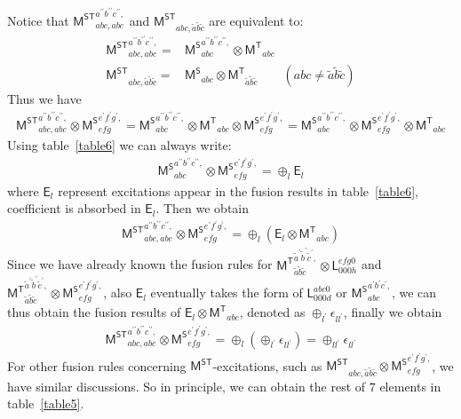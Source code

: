 \documentclass[11pt,nofootinbib,preprint]{revtex4-1}
\begin{document}
Notice that $\mathsf{M^{ST}}_{abc,abc}^{a^{\prime\prime}b^{\prime\prime}c^{\prime\prime},}$ and $\mathsf{M^{ST}}_{abc,\tilde{a}\tilde{b}\tilde{c}}$ are equivalent to:
\begin{align}
	\mathsf{M^{ST}}_{abc,abc}^{a^{\prime\prime}b^{\prime\prime}c^{\prime\prime},}=&\mathsf{M^S}_{abc}^{a^{\prime\prime}b^{\prime\prime}c^{\prime\prime},}\otimes \mathsf{M^T}_{abc}
	\\
	\mathsf{M^{ST}}_{abc,\tilde{a}\tilde{b}\tilde{c}}=&\mathsf{M^S}_{abc}\otimes \mathsf{M^T}_{\tilde{a}\tilde{b}\tilde{c}} \qquad \left(abc\ne\tilde{a}\tilde{b}\tilde{c}\right)
\end{align}
Thus we have 
\begin{align}
	\mathsf{M^{ST}}_{abc,abc}^{a^{\prime\prime}b^{\prime\prime}c^{\prime\prime},}\otimes \mathsf{M^S}_{efg}^{e^{\prime}f^{\prime}g^{\prime},}=\mathsf{M^S}_{abc}^{a^{\prime\prime}b^{\prime\prime}c^{\prime\prime},}\otimes \mathsf{M^T}_{abc}\otimes \mathsf{M^S}_{efg}^{e^{\prime}f^{\prime}g^{\prime},}=\mathsf{M^S}_{abc}^{a^{\prime\prime}b^{\prime\prime}c^{\prime\prime},}\otimes \mathsf{M^S}_{efg}^{e^{\prime}f^{\prime}g^{\prime},}\otimes \mathsf{M^T}_{abc}
\end{align}
Using table~\ref{table6} we can always write:
\begin{align}
	\mathsf{M^S}_{abc}^{a^{\prime\prime}b^{\prime\prime}c^{\prime\prime},}\otimes \mathsf{M^S}_{efg}^{e^{\prime}f^{\prime}g^{\prime},}=\oplus_{l}\mathsf{E}_{l}
\end{align}
where $\mathsf{E}_{l}$ represent excitations appear in the fusion results in table~\ref{table6}, coefficient is absorbed in $\mathsf{E}_{l}$. Then we obtain 
\begin{align}
	\mathsf{M^{ST}}_{abc,abc}^{a^{\prime\prime}b^{\prime\prime}c^{\prime\prime},}\otimes \mathsf{M^S}_{efg}^{e^{\prime}f^{\prime}g^{\prime},}=\oplus_{l}\left(\mathsf{E}_{l}\otimes \mathsf{M^T}_{abc}\right)
\end{align}
Since we have already known the fusion rules for $\mathsf{M^T}_{\tilde{a}\tilde{b}\tilde{c}}^{\tilde{a}^{\prime}\tilde{b}^{\prime}\tilde{c}^{\prime},}\otimes \mathsf{L}_{000h}^{efg0}$ and $\mathsf{M^T}_{\tilde{a}\tilde{b}\tilde{c}}^{\tilde{a}^{\prime}\tilde{b}^{\prime}\tilde{c}^{\prime},}\otimes \mathsf{M^S}_{efg}^{e^{\prime}f^{\prime}g^{\prime},}$, also $\mathsf{E}_{l}$ eventually takes the form of $\mathsf{L}_{000d}^{abc0}$ or $\mathsf{M^S}_{abc}^{a^{\prime}b^{\prime}c^{\prime},}$, we can thus obtain the fusion results of $\mathsf{E}_{l}\otimes \mathsf{M^T}_{abc}$, denoted as $\oplus_{l^{\prime}}\mathsf{\epsilon}_{ll^{\prime}}$, finally we obtain 
\begin{align}
	\mathsf{M^{ST}}_{abc,abc}^{a^{\prime\prime}b^{\prime\prime}c^{\prime\prime},}\otimes \mathsf{M^S}_{efg}^{e^{\prime}f^{\prime}g^{\prime},}=\oplus_{l}\left(\oplus_{l^{\prime}}\mathsf{\epsilon}_{ll^{\prime}}\right)=\oplus_{ll^{\prime}}\mathsf{\epsilon}_{ll^{\prime}}
\end{align}
For other fusion rules concerning $\mathsf{M^{ST}}$-excitations, such as $\mathsf{M^{ST}}_{abc,\tilde{a}\tilde{b}\tilde{c}}\otimes \mathsf{M^S}_{efg}^{e^{\prime}f^{\prime}g^{\prime},}$, we have similar discussions. So in principle, we can obtain the rest of $7$ elements in table~\ref{table5}.
\end{document}
